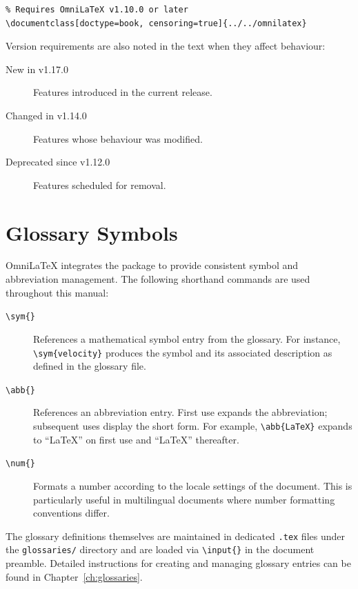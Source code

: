 \begin{verbatim}
% Requires OmniLaTeX v1.10.0 or later
\documentclass[doctype=book, censoring=true]{../../omnilatex}
\end{verbatim}

Version requirements are also noted in the text when they affect
behaviour:

\begin{description}
    \item[New in v1.17.0] Features introduced in the current release.
    \item[Changed in v1.14.0] Features whose behaviour was modified.
    \item[Deprecated since v1.12.0] Features scheduled for removal.
\end{description}

\section{Glossary Symbols}

OmniLaTeX integrates the  package to provide
consistent symbol and abbreviation management.  The following shorthand
commands are used throughout this manual:

\begin{description}
    \item[{\texttt{\textbackslash sym\{\}}}] References a mathematical symbol
        entry from the glossary.  For instance,
        \texttt{\textbackslash sym\{velocity\}} produces the symbol and its
        associated description as defined in the glossary file.
    \item[{\texttt{\textbackslash abb\{\}}}] References an abbreviation entry.
        First use expands the abbreviation; subsequent uses display the short
        form.  For example, \texttt{\textbackslash abb\{LaTeX\}} expands to
        ``\LaTeX{}'' on first use and ``\LaTeX{}'' thereafter.
    \item[{\texttt{\textbackslash num\{\}}}] Formats a number according to the
        locale settings of the document.  This is particularly useful in
        multilingual documents where number formatting conventions differ.
\end{description}

The glossary definitions themselves are maintained in dedicated
\texttt{.tex} files under the \texttt{glossaries/} directory and are loaded
via \texttt{\textbackslash input\{\}} in the document preamble.  Detailed
instructions for creating and managing glossary entries can be found in
Chapter~\ref{ch:glossaries}.
